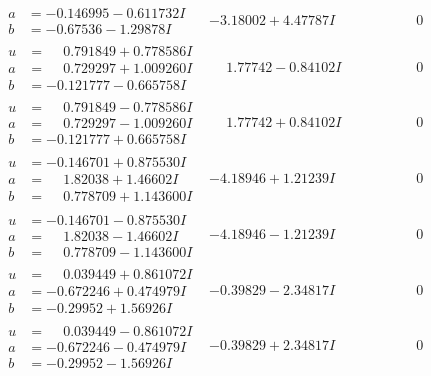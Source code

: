 \documentclass[1p]{elsarticle_modified}
\theoremstyle{definition}
\begin{document}
$$\begin{array}{c|c|c}
\begin{aligned}
a &= -0.146995 - 0.611732 I \\
b &= -0.67536 - 1.29878 I\end{aligned}
 & -3.18002 + 4.47787 I & \phantom{-0.000000 } 0 \\ \hline\begin{aligned}
u &= \phantom{-}0.791849 + 0.778586 I \\
a &= \phantom{-}0.729297 + 1.009260 I \\
b &= -0.121777 - 0.665758 I\end{aligned}
 & \phantom{-}1.77742 - 0.84102 I & \phantom{-0.000000 } 0 \\ \hline\begin{aligned}
u &= \phantom{-}0.791849 - 0.778586 I \\
a &= \phantom{-}0.729297 - 1.009260 I \\
b &= -0.121777 + 0.665758 I\end{aligned}
 & \phantom{-}1.77742 + 0.84102 I & \phantom{-0.000000 } 0 \\ \hline\begin{aligned}
u &= -0.146701 + 0.875530 I \\
a &= \phantom{-}1.82038 + 1.46602 I \\
b &= \phantom{-}0.778709 + 1.143600 I\end{aligned}
 & -4.18946 + 1.21239 I & \phantom{-0.000000 } 0 \\ \hline\begin{aligned}
u &= -0.146701 - 0.875530 I \\
a &= \phantom{-}1.82038 - 1.46602 I \\
b &= \phantom{-}0.778709 - 1.143600 I\end{aligned}
 & -4.18946 - 1.21239 I & \phantom{-0.000000 } 0 \\ \hline\begin{aligned}
u &= \phantom{-}0.039449 + 0.861072 I \\
a &= -0.672246 + 0.474979 I \\
b &= -0.29952 + 1.56926 I\end{aligned}
 & -0.39829 - 2.34817 I & \phantom{-0.000000 } 0 \\ \hline\begin{aligned}
u &= \phantom{-}0.039449 - 0.861072 I \\
a &= -0.672246 - 0.474979 I \\
b &= -0.29952 - 1.56926 I\end{aligned}
 & -0.39829 + 2.34817 I & \phantom{-0.000000 } 0 \\ \hline\begin{aligned}

\end{aligned}
\end{array}$$
\end{document}
